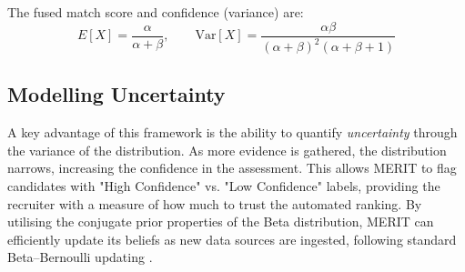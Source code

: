 The fused match score and confidence (variance) are:
\begin{equation} \label{eq:beta_distribution}
    E[X] = \frac{\alpha}{\alpha + \beta},
    \qquad
    \mathrm{Var}[X] = \frac{\alpha \beta}{(\alpha + \beta)^2 (\alpha + \beta + 1)}
\end{equation}

\subsection*{Modelling Uncertainty}
A key advantage of this framework is the ability to quantify \textit{uncertainty} through the variance of the distribution. 
As more evidence is gathered, the distribution narrows, increasing the confidence in the assessment. 
This allows MERIT to flag candidates with "High Confidence" vs. "Low Confidence" labels, providing the recruiter with a measure of how much to trust the automated ranking. 
By utilising the conjugate prior properties of the Beta distribution, MERIT can efficiently update its beliefs as new data sources are ingested, 
following standard Beta--Bernoulli updating \cite{gelman2013bayesian}.
